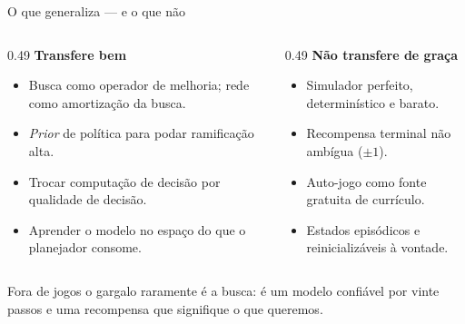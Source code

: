 \documentclass[aspectratio=169, 11pt]{beamer}
\begin{document}
\begin{frame}{O que generaliza --- e o que não}
  \begin{columns}[T]
    \begin{column}{0.49\textwidth}
      \textbf{\color{rlVerde!70!black}Transfere bem}
      \begin{itemize}\setlength{\itemsep}{0.2ex}
        \item Busca como operador de melhoria; rede como amortização da busca.
        \item \emph{Prior} de política para podar ramificação alta.
        \item Trocar computação de decisão por qualidade de decisão.
        \item Aprender o modelo no espaço do que o planejador consome.
      \end{itemize}
    \end{column}
    \begin{column}{0.49\textwidth}
      \textbf{\color{rlVermelho}Não transfere de graça}
      \begin{itemize}\setlength{\itemsep}{0.2ex}
        \item Simulador perfeito, determinístico e barato.
        \item Recompensa terminal não ambígua ($\pm1$).
        \item Auto-jogo como fonte gratuita de currículo.
        \item Estados episódicos e reinicializáveis à vontade.
      \end{itemize}
    \end{column}
  \end{columns}

  \vspace{-2pt}
  \begin{alertabox}
    Fora de jogos o gargalo raramente é a busca: é um modelo confiável por vinte passos e uma recompensa que signifique o que queremos.
  \end{alertabox}
\end{frame}
\end{document}
